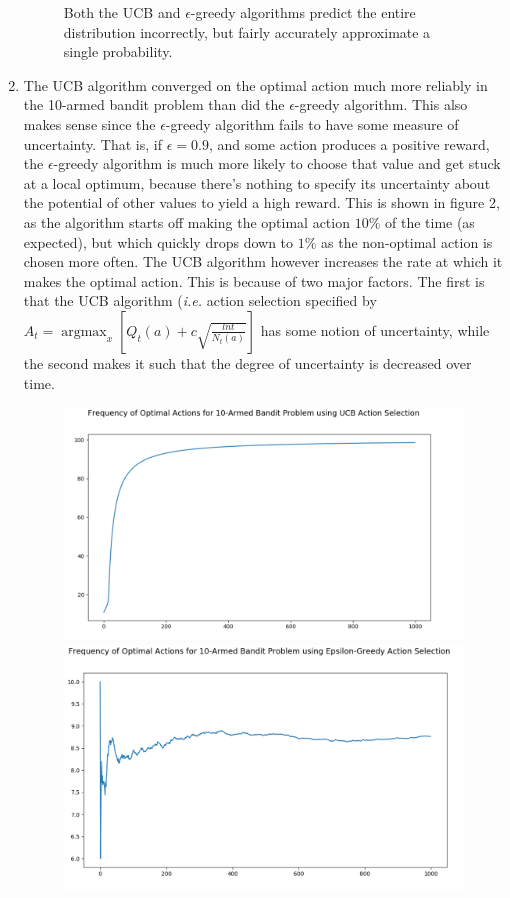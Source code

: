 \documentclass{article}
\DeclareMathOperator*{\argmax}{argmax}
\begin{document}
\begin{enumerate}
\begin{figure}[h]
	\caption{Both the UCB and $\epsilon$-greedy algorithms predict the entire distribution incorrectly, but fairly accurately approximate a single probability.}
	\end{figure}
	\item The UCB algorithm converged on the optimal action much more reliably in the 10-armed bandit problem than did the $\epsilon$-greedy algorithm. This also makes sense since the $\epsilon$-greedy algorithm fails to have some measure of uncertainty. That is, if $\epsilon=0.9$, and some action produces a positive reward, the $\epsilon$-greedy algorithm is much more likely to choose that value and get stuck at a local optimum, because there's nothing to specify its uncertainty about the potential of other values to yield a high reward. This is shown in figure 2, as the algorithm starts off making the optimal action $10\%$ of the time (as expected), but which quickly drops down to $1\%$ as the non-optimal action is chosen more often. The UCB algorithm however increases the rate at which it makes the optimal action. This is because of two major factors. The first is that the UCB algorithm (\textit{i.e.} action selection specified by $A_t = \argmax_x [Q_t(a) + c\sqrt{\frac{lnt}{N_t(a)}}]$ has some notion of uncertainty, while the second makes it such that the degree of uncertainty is decreased over time. 
	\begin{figure}[h]
	\centering
	\includegraphics[scale=0.2]{ucb_opt}
	\includegraphics[scale=0.2]{eps_opt}

\end{figure}
\end{enumerate}
\end{document}
